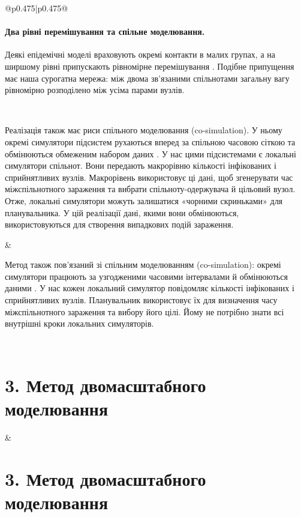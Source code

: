 \documentclass[11pt]{article}
\begin{document}
\begin{longtable}{@{}p{0.475\textwidth}|p{0.475\textwidth}@{}}
\begin{minipage}[t]{\linewidth}
\paragraph{Два рівні перемішування та спільне моделювання.}
Деякі епідемічні моделі враховують окремі контакти в малих групах, а на ширшому рівні припускають рівномірне перемішування \citep{ball1997}. Подібне припущення має наша сурогатна мережа: між двома зв'язаними спільнотами загальну вагу рівномірно розподілено між усіма парами вузлів.
\end{minipage} \\[5mm]
\begin{minipage}[t]{\linewidth}
Реалізація також має риси спільного моделювання (co-simulation). У ньому окремі симулятори підсистем рухаються вперед за спільною часовою сіткою та обмінюються обмеженим набором даних \citep{gomes2018cosim}. У нас цими підсистемами є локальні симулятори спільнот. Вони передають макрорівню кількості інфікованих і сприйнятливих вузлів. Макрорівень використовує ці дані, щоб згенерувати час міжспільнотного зараження та вибрати спільноту-одержувача й цільовий вузол. Отже, локальні симулятори можуть залишатися «чорними скриньками» для планувальника. У цій реалізації дані, якими вони обмінюються, використовуються для створення випадкових подій зараження.
\end{minipage} &
\begin{minipage}[t]{\linewidth}
Метод також пов'язаний зі спільним моделюванням (co-simulation): окремі симулятори працюють за узгодженими часовими інтервалами й обмінюються даними \citep{gomes2018cosim}. У нас кожен локальний симулятор повідомляє кількості інфікованих і сприйнятливих вузлів. Планувальник використовує їх для визначення часу міжспільнотного зараження та вибору його цілі. Йому не потрібно знати всі внутрішні кроки локальних симуляторів.
\end{minipage} \\[5mm]
\begin{minipage}[t]{\linewidth}
\section*{3. Метод двомасштабного моделювання}

\end{minipage} &
\begin{minipage}[t]{\linewidth}
\section*{3. Метод двомасштабного моделювання}


\end{minipage}
\end{longtable}
\end{document}

